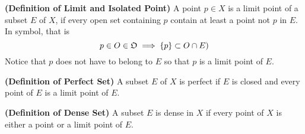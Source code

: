 \documentclass{report}
\begin{document}
\begin{definition}
\label{2.6.8}
\textbf{(Definition of Limit and Isolated Point)} A point $p \in X$ is a limit point of a subset $E$ of $X$, if every open set containing $p$ contain at least a point not  $p$ in $E$. In symbol, that is
\begin{equation}
p \in O \in \mathfrak{O}\implies \{ p \}\subset O\cap E)
\end{equation}
Notice that $p$ does not have to belong to $E$ so that  $p$ is a limit point of  $E$. 
\end{definition}
\begin{definition}
\label{2.6.9}
\textbf{(Definition of Perfect Set)} A subset $E$ of  $X$ is perfect if  $E$ is closed and every point of  $E$ is a limit point of  $E$.
\end{definition}
\begin{definition}
\label{2.6.10}
\textbf{(Definition of Dense Set)} A subset $E$ is dense in $X$ if every point of  $X$ is either a point or a limit point of  $E$. 
\end{definition}
\end{document}
